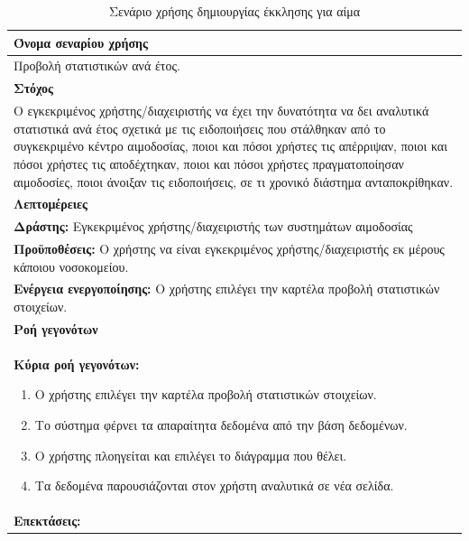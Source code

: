 \begin{table}[H]
	\begin{center}
	    \begin{tabular}{|p{\dimexpr \linewidth-2\tabcolsep}|}
	    \hline
	    \rowcolor{grayy}
	    \textbf{Όνομα σεναρίου χρήσης}
	    \\ \hline    
	    Προβολή στατιστικών ανά έτος.
	     \\ \hline
	    \rowcolor{grayy}
	    \textbf{\textbf{Στόχος}}
	    \\ \hline
	 	 Ο εγκεκριμένος χρήστης/διαχειριστής να έχει την δυνατότητα να δει αναλυτικά στατιστικά ανά έτος σχετικά με τις ειδοποιήσεις που στάλθηκαν από το συγκεκριμένο κέντρο αιμοδοσίας, ποιοι και πόσοι χρήστες τις απέρριψαν, ποιοι και πόσοι χρήστες τις αποδέχτηκαν, ποιοι και πόσοι χρήστες πραγματοποίησαν αιμοδοσίες, ποιοι άνοιξαν τις ειδοποιήσεις, σε τι χρονικό διάστημα ανταποκρίθηκαν.
	    \\ \hline
	    \rowcolor{grayy}
	    \textbf{Λεπτομέρειες}
	    \\ \hline
		\textbf{Δράστης:} Εγκεκριμένος χρήστης/διαχειριστής των συστημάτων αιμοδοσίας
		\\*
		\textbf{Προϋποθέσεις:} Ο χρήστης να είναι εγκεκριμένος χρήστης/διαχειριστής εκ μέρους κάποιου νοσοκομείου.
		\\*
		\textbf{Ενέργεια ενεργοποίησης:} Ο χρήστης επιλέγει την καρτέλα προβολή στατιστικών στοιχείων.
		\\ \hline
		\rowcolor{grayy}    
	    \textbf{Ροή γεγονότων}
	    \\ \hline
		\textbf{Κύρια ροή γεγονότων:}
		\begin{enumerate}
		\item	 Ο χρήστης επιλέγει την καρτέλα προβολή στατιστικών στοιχείων.
		\item Το σύστημα φέρνει τα απαραίτητα δεδομένα από την βάση δεδομένων.
		\item Ο χρήστης πλοηγείται και επιλέγει το διάγραμμα που θέλει.
		\item Τα δεδομένα παρουσιάζονται στον χρήστη αναλυτικά  σε νέα σελίδα.
		\end{enumerate}
		\\ \hline
		\textbf{Επεκτάσεις:}
		   \\ \hline
	    \end{tabular}
	    \caption{Σενάριο χρήσης δημιουργίας έκκλησης για αίμα}
	    \label{tab:view_year_statistics} 
	\end{center}
\end{table}


